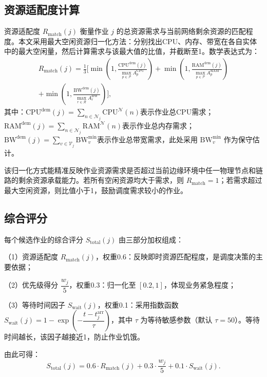\subsection{资源适配度计算}
资源适配度 $R_{\text{match}}(j)$ 衡量作业 $j$ 的总资源需求与当前网络剩余资源的匹配程度。本文采用最大空闲资源归一化方法：分别找出CPU、内存、带宽在各自实体中的最大空闲量，然后计算需求与该最大值的比值，并截断至1。数学表达式为：
\begin{equation}
    \begin{split}
    R_{\text{match}}(j) = \frac{1}{3} \Bigg[
    \min\left(1, \frac{\text{CPU}^{\text{dem}}(j)}{\max_{p \in \mathcal{P}} A_p^{\text{CPU}}}\right)
    + \min\left(1, \frac{\text{RAM}^{\text{dem}}(j)}{\max_{p \in \mathcal{P}} A_p^{\text{RAM}}}\right) \\
    + \min\left(1, \frac{\text{BW}^{\text{dem}}(j)}{\max_{r \in \mathcal{R}} A_r^{\text{BW}}}\right)
    \Bigg],
    \end{split}
    \label{eq:match}
\end{equation}
其中：$\text{CPU}^{\text{dem}}(j) = \sum_{n \in \mathcal{N}_j} \text{CPU}^\mathcal{N}(n)$表示作业总CPU需求；$\text{RAM}^{\text{dem}}(j) = \sum_{n \in \mathcal{N}_j} \text{RAM}^\mathcal{N}(n)$表示作业总内存需求；$\text{BW}^{\text{dem}}(j) = \sum_{v \in \mathcal{V}_j} \text{BW}_v^{\min}$表示作业总带宽需求，此处采用 $\text{BW}_v^{\min}$ 作为保守估计。

该归一化方式能精准反映作业资源需求是否超过当前边缘环境中任一物理节点和链路的剩余资源承载能力。若所有空闲资源均大于需求，则 $R_{\text{match}}=1$；若需求超过最大空闲资源，则比值小于1，鼓励调度需求较小的作业。

\subsection{综合评分}
每个候选作业的综合评分 $S_{\text{total}}(j)$ 由三部分加权组成：

（1）资源适配度 $R_{\text{match}}(j)$，权重0.6：反映即时资源匹配程度，是调度决策的主要依据；

（2）优先级得分 $\dfrac{w_j}{5}$，权重0.3：归一化至 $[0.2,1]$，体现业务紧急程度；

（3）等待时间因子 $S_{\text{wait}}(j)$，权重0.1：采用指数函数 $S_{\text{wait}}(j)=1-\exp\left(-\dfrac{t-t_j^{\text{arr}}}{\tau}\right)$，其中 $\tau$ 为等待敏感参数（默认 $\tau=50$）。等待时间越长，该因子越接近1，防止作业饥饿。

由此可得：
\begin{equation}
    S_{\text{total}}(j) = 0.6 \cdot R_{\text{match}}(j) + 0.3 \cdot \frac{w_j}{5} + 0.1 \cdot S_{\text{wait}}(j).
    \label{eq:score}
\end{equation}

